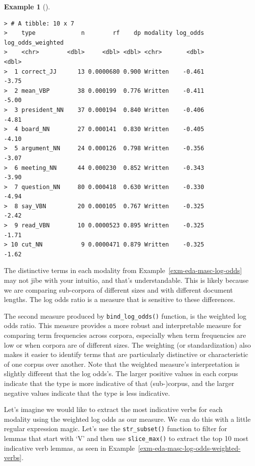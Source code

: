 \documentclass[
  letterpaper,
  DIV=11,
  numbers=noendperiod]{scrreport}
\theoremstyle{definition}
\newtheorem{example}{Example}[chapter]
\theoremstyle{remark}
\begin{document}
\begin{example}[]
\begin{verbatim}
> # A tibble: 10 x 7
>    type             n        rf    dp modality log_odds log_odds_weighted
>    <chr>        <dbl>     <dbl> <dbl> <chr>       <dbl>             <dbl>
>  1 correct_JJ      13 0.0000680 0.900 Written    -0.461             -3.75
>  2 mean_VBP        38 0.000199  0.776 Written    -0.411             -5.00
>  3 president_NN    37 0.000194  0.840 Written    -0.406             -4.81
>  4 board_NN        27 0.000141  0.830 Written    -0.405             -4.10
>  5 argument_NN     24 0.000126  0.798 Written    -0.356             -3.07
>  6 meeting_NN      44 0.000230  0.852 Written    -0.343             -3.90
>  7 question_NN     80 0.000418  0.630 Written    -0.330             -4.94
>  8 say_VBN         20 0.000105  0.767 Written    -0.325             -2.42
>  9 read_VBN        10 0.0000523 0.895 Written    -0.325             -1.71
> 10 cut_NN           9 0.0000471 0.879 Written    -0.325             -1.62
\end{verbatim}

\end{example}

The distinctive terms in each modality from
Example~\ref{exm-eda-masc-log-odds} may not jibe with your intuitio, and
that's understandable. This is likely because we are comparing
sub-corpora of different sizes and with different document lengths. The
log odds ratio is a measure that is sensitive to these differences.

The second measure produced by \texttt{bind\_log\_odds()} function, is
the weighted log odds ratio. This measure provides a more robust and
interpretable measure for comparing term frequencies across corpora,
especially when term frequencies are low or when corpora are of
different sizes. The weighting (or standardization) also makes it easier
to identify terms that are particularly distinctive or characteristic of
one corpus over another. Note that the weighted measure's interpretation
is slightly different that the log odds's. The larger positive values in
each corpus indicate that the type is more indicative of that
(sub-)corpus, and the larger negative values indicate that the type is
less indicative.

Let's imagine we would like to extract the most indicative verbs for
each modality using the weighted log odds as our measure. We can do this
with a little regular expression magic. Let's use the
\texttt{str\_subset()} function to filter for lemmas that start with `V'
and then use \texttt{slice\_max()} to extract the top 10 most indicative
verb lemmas, as seen in
Example~\ref{exm-eda-masc-log-odds-weighted-verbs}.
\end{document}
